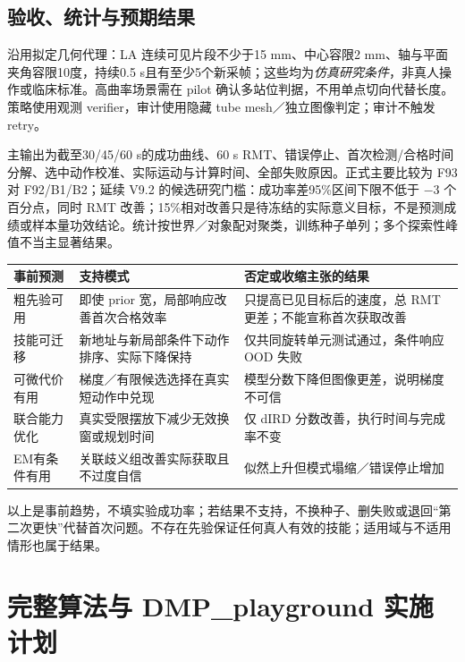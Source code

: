 \documentclass[UTF8,fontset=fandol,11pt,a4paper]{ctexart}
\theoremstyle{plain}
\theoremstyle{definition}
\theoremstyle{remark}
\numberwithin{equation}{section}
\begin{document}
\subsection{验收、统计与预期结果}
沿用拟定几何代理：LA 连续可见片段不少于15 mm、中心容限2 mm、轴与平面夹角容限10度，持续0.5 s且有至少5个新采帧；这些均为\emph{仿真研究条件}，非真人操作或临床标准。高曲率场景需在 pilot 确认多站位判据，不用单点切向代替长度。策略使用观测 verifier，审计使用隐藏 tube mesh／独立图像判定；审计不触发 retry。

主输出为截至30/45/60 s的成功曲线、60 s RMT、错误停止、首次检测/合格时间分解、选中动作校准、实际运动与计算时间、全部失败原因。正式主要比较为 F93 对 F92/B1/B2；延续 V9.2 的候选研究门槛：成功率差95\%区间下限不低于 $-3$ 个百分点，同时 RMT 改善；15\%相对改善只是待冻结的实际意义目标，不是预测成绩或样本量功效结论。统计按世界／对象配对聚类，训练种子单列；多个探索性峰值不当主显著结果。

\begin{longtable}{P{28mm}P{58mm}P{60mm}}
\toprule 事前预测 & 支持模式 & 否定或收缩主张的结果\\\midrule\endhead
粗先验可用 & 即使 prior 宽，局部响应改善首次合格效率 & 只提高已见目标后的速度，总 RMT 更差；不能宣称首次获取改善\\
技能可迁移 & 新地址与新局部条件下动作排序、实际下降保持 & 仅共同旋转单元测试通过，条件响应 OOD 失败\\
可微代价有用 & 梯度／有限候选选择在真实短动作中兑现 & 模型分数下降但图像更差，说明梯度不可信\\
联合能力优化 & 真实受限摆放下减少无效换窗或规划时间 & 仅 dIRD 分数改善，执行时间与完成率不变\\
EM有条件有用 & 关联歧义组改善实际获取且不过度自信 & 似然上升但模式塌缩／错误停止增加\\\bottomrule
\end{longtable}

以上是事前趋势，不填实验成功率；若结果不支持，不换种子、删失败或退回“第二次更快”代替首次问题。不存在先验保证任何真人有效的技能；适用域与不适用情形也属于结果。

\section{完整算法与 DMP\_playground 实施计划}
\label{sec:implementation}
\end{document}
